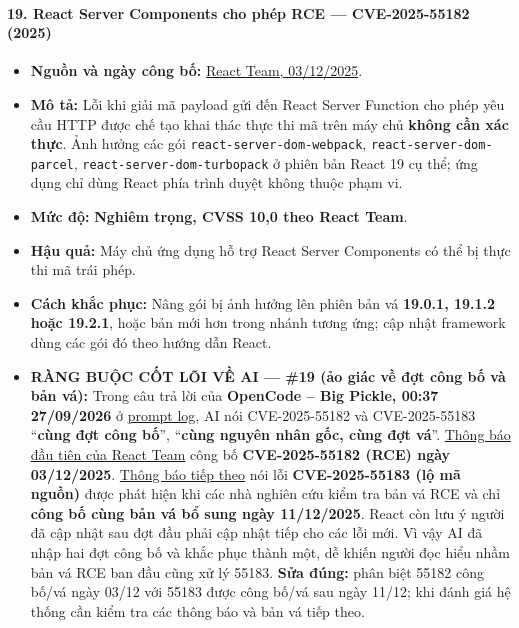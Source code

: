\paragraph{19. React Server Components cho phép RCE --- CVE-2025-55182 (2025)}\label{react-server-components-cho-phuxe9p-rce-cve-2025-55182-2025}

\begin{itemize}
\tightlist
\item
  \textbf{Nguồn và ngày công bố:} \href{https://react.dev/blog/2025/12/03/critical-security-vulnerability-in-react-server-components}{React Team, 03/12/2025}.
\item
  \textbf{Mô tả:} Lỗi khi giải mã payload gửi đến React Server Function cho phép yêu cầu HTTP được chế tạo khai thác thực thi mã trên máy chủ \textbf{không cần xác thực}. Ảnh hưởng các gói \texttt{react-server-dom-webpack}, \texttt{react-server-dom-parcel}, \texttt{react-server-dom-\allowbreak{}turbopack} ở phiên bản React 19 cụ thể; ứng dụng chỉ dùng React phía trình duyệt không thuộc phạm vi.
\item
  \textbf{Mức độ:} \textbf{Nghiêm trọng, CVSS 10,0 theo React Team}.
\item
  \textbf{Hậu quả:} Máy chủ ứng dụng hỗ trợ React Server Components có thể bị thực thi mã trái phép.
\item
  \textbf{Cách khắc phục:} Nâng gói bị ảnh hưởng lên phiên bản vá \textbf{19.0.1, 19.1.2 hoặc 19.2.1}, hoặc bản mới hơn trong nhánh tương ứng; cập nhật framework dùng các gói đó theo hướng dẫn React.
\item
  \textbf{RÀNG BUỘC CỐT LÕI VỀ AI --- \#19 (ảo giác về đợt công bố và bản vá):} Trong câu trả lời của \textbf{OpenCode -- Big Pickle, 00:37 27/09/2026} ở \href{Appendix_A_Prompt_Log.md}{prompt log}, AI nói CVE-2025-55182 và CVE-2025-55183 ``\textbf{cùng đợt công bố}'', ``\textbf{cùng nguyên nhân gốc, cùng đợt vá}''. \href{https://react.dev/blog/2025/12/03/critical-security-vulnerability-in-react-server-components}{Thông báo đầu tiên của React Team} công bố \textbf{CVE-2025-55182 (RCE) ngày 03/12/2025}. \href{https://react.dev/blog/2025/12/11/denial-of-service-and-source-code-exposure-in-react-server-components}{Thông báo tiếp theo} nói lỗi \textbf{CVE-2025-55183 (lộ mã nguồn)} được phát hiện khi các nhà nghiên cứu kiểm tra bản vá RCE và chỉ \textbf{công bố cùng bản vá bổ sung ngày 11/12/2025}. React còn lưu ý người đã cập nhật sau đợt đầu phải cập nhật tiếp cho các lỗi mới. Vì vậy AI đã nhập hai đợt công bố và khắc phục thành một, dễ khiến người đọc hiểu nhầm bản vá RCE ban đầu cũng xử lý 55183. \textbf{Sửa đúng:} phân biệt 55182 công bố/vá ngày 03/12 với 55183 được công bố/vá sau ngày 11/12; khi đánh giá hệ thống cần kiểm tra các thông báo và bản vá tiếp theo.
\end{itemize}

